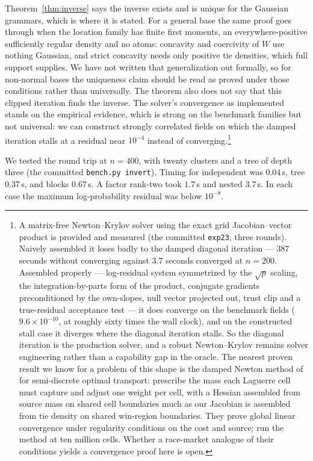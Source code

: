 \documentclass[11pt]{article}
\begin{document}
Theorem~\ref{thm:inverse} says the inverse exists and is unique for the
Gaussian grammars, which is where it is stated. For a general base the
same proof goes through when the location family has finite first
moments, an everywhere-positive sufficiently regular density and no
atoms: concavity and coercivity of $W$ use nothing Gaussian, and strict
concavity needs only positive tie densities, which full support supplies.
We have not written that generalization out formally, so for non-normal
bases the uniqueness claim should be read as proved under those
conditions rather than universally. The theorem also does not say that
this clipped iteration finds the inverse. The solver's convergence as
implemented stands on the empirical evidence, which is strong on the
benchmark families but not universal: we can construct strongly
correlated fields on which the damped iteration stalls at a residual
near $10^{-4}$ instead of converging.\footnote{A matrix-free
Newton--Krylov solver using the exact grid Jacobian--vector product is
provided and measured (the committed \texttt{exp23}, three rounds).
Naively assembled it loses badly to the damped diagonal iteration ---
$387$ seconds without converging against $3.7$ seconds converged at
$n=200$. Assembled properly --- log-residual system symmetrized by the
$\sqrt{p}$ scaling, the integration-by-parts form of the product,
conjugate gradients preconditioned by the own-slopes, null vector
projected out, trust clip and a true-residual acceptance test --- it
does converge on the benchmark fields ($9.6\times10^{-10}$, at roughly
sixty times the wall clock), and on the constructed stall case it
diverges where the diagonal iteration stalls. So the diagonal iteration
is the production solver, and a robust Newton--Krylov remains solver
engineering rather than a capability gap in the oracle. The nearest
proven result we know for a problem of this shape is the damped Newton
method of \citet{kitagawa2019} for semi-discrete optimal transport:
prescribe the mass each Laguerre cell must capture and adjust one
weight per cell, with a Hessian assembled from source mass on shared
cell boundaries much as our Jacobian is assembled from tie density on
shared win-region boundaries. They prove global linear convergence
under regularity conditions on the cost and source;
\citet{levy2021} run the method at ten million cells. Whether a
race-market analogue of their conditions yields a convergence proof
here is open.}

We tested the round trip at $n=400$, with twenty
clusters and a tree of depth three (the committed \texttt{bench.py
invert}). Timing for independent was $0.04$\,s, tree $0.37$\,s, and blocks $0.67$\,s. A factor
rank-two took $1.7$\,s and nested $3.7$\,s. In each case the maximum log-probability residual was below $10^{-8}$.
\end{document}
